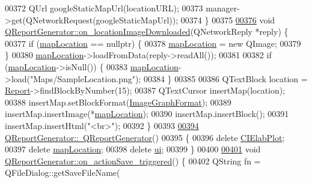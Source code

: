 \begin{DoxyCode}
{{00372   QUrl googleStaticMapUrl(locationURL);
00373   manager->get(QNetworkRequest(googleStaticMapUrl));
00374 \}
00375 
\hypertarget{qreportgenerator_8cpp_source_l00376}{}\hyperlink{class_q_report_generator_a15c7c37fe5a9f178ae29bc1484aeaad9}{00376} \textcolor{keywordtype}{void} \hyperlink{class_q_report_generator_a15c7c37fe5a9f178ae29bc1484aeaad9}{QReportGenerator::on\_locationImageDownloaded}(QNetworkReply
       *reply) \{
00377   \textcolor{keywordflow}{if} (\hyperlink{class_q_report_generator_a1369081e13fce26f60a10eb846551515}{mapLocation} == \textcolor{keyword}{nullptr}) \{
00378     \hyperlink{class_q_report_generator_a1369081e13fce26f60a10eb846551515}{mapLocation} = \textcolor{keyword}{new} QImage;
00379   \}
00380   \hyperlink{class_q_report_generator_a1369081e13fce26f60a10eb846551515}{mapLocation}->loadFromData(reply->readAll());
00381 
00382   \textcolor{keywordflow}{if} (\hyperlink{class_q_report_generator_a1369081e13fce26f60a10eb846551515}{mapLocation}->isNull()) \{
00383     \hyperlink{class_q_report_generator_a1369081e13fce26f60a10eb846551515}{mapLocation}->load(\textcolor{stringliteral}{"Maps/SampleLocation.png"});
00384   \}
00385 
00386   QTextBlock location = \hyperlink{class_q_report_generator_ab051048608bc51151bc0b1ffc217f292}{Report}->findBlockByNumber(15);
00387   QTextCursor insertMap(location);
00388   insertMap.setBlockFormat(\hyperlink{class_q_report_generator_a19451127788bb6c68907b312a0a8b750}{ImageGraphFormat});
00389   insertMap.insertImage(*\hyperlink{class_q_report_generator_a1369081e13fce26f60a10eb846551515}{mapLocation});
00390   insertMap.insertBlock();
00391   insertMap.insertHtml(\textcolor{stringliteral}{"<br>"});
00392 \}
00393 
\hypertarget{qreportgenerator_8cpp_source_l00394}{}\hyperlink{class_q_report_generator_a42ad110fb06f47767b6a94feb49f85c0}{00394} \hyperlink{class_q_report_generator_a42ad110fb06f47767b6a94feb49f85c0}{QReportGenerator::~QReportGenerator}()
00395 \{
00396   \textcolor{keyword}{delete} \hyperlink{class_q_report_generator_a1a727308ea8cb98523a308d10da70b39}{CIElabPlot};
00397   \textcolor{keyword}{delete} \hyperlink{class_q_report_generator_a1369081e13fce26f60a10eb846551515}{mapLocation};
00398   \textcolor{keyword}{delete} \hyperlink{class_q_report_generator_a4584dd4f053586b84b4a9f883a3313d9}{ui};
00399 \}
00400 
\hypertarget{qreportgenerator_8cpp_source_l00401}{}\hyperlink{class_q_report_generator_a7f16a79d19c4ae53859febaae31950e7}{00401} \textcolor{keywordtype}{void} \hyperlink{class_q_report_generator_a7f16a79d19c4ae53859febaae31950e7}{QReportGenerator::on\_actionSave\_triggered}() \{
00402   QString fn = QFileDialog::getSaveFileName(
}}
\end{DoxyCode}
